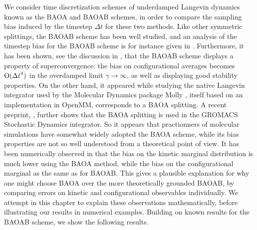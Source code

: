 We consider time discretization schemes of underdamped Langevin dynamics known as the BAOA and BAOAB schemes, in order to compare the sampling bias induced by the timestep $\Delta t$ for these two methods.
Like other symmetric splittings, the BAOAB scheme has been well studied, and an analysis of the timestep bias for the BAOAB scheme is for instance given in \cite{LMS13}.
Furthermore, it has been shown, see the discussion in \cite[Section 7.9.3]{LM15}, that the BAOAB scheme displays a property of superconvergence: the bias on configurational averages becomes $\mathrm{O}({\Delta t}^4)$ in the overdamped limit $\gamma\to\infty$, as well as displaying good stability properties.
On the other hand, it appeared while studying the native Langevin integrator used by the Molecular Dynamics package Molly \cite{Molly}, itself based on an implementation in OpenMM, corresponds to a BAOA splitting. A recent preprint, \cite{KK22}, further shows that the BAOA splitting is used in the GROMACS Stochastic Dynamics integrator.
So it appears that practionners of molecular simulations have somewhat widely adopted the BAOA scheme, while its bias properties are not so well understood from a theoretical point of view.
It has been numerically observed in \cite[Section III.B]{KK22} that the bias on the kinetic marginal distribution is much lower using the BAOA method, while the bias on the configurational marginal as the same as for BAOAB.
This gives a plausible explanation for why one might choose BAOA over the more theoretically grounded BAOAB, by comparing errors on kinetic and configurational observables individually.
We attempt in this chapter to explain these observations mathematically, before illustrating our results in numerical examples.
Building on known results for the BAOAB scheme, we show the following results.
